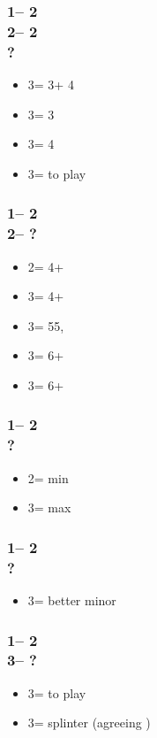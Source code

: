 \documentclass[12pt, a4paper]{article}
\begin{document}
\subsubsection*{1\nt -- 2\diams\\
                2\hearts -- 2\nt\\
                ?}
\begin{itemize}
    \item 3\clubs = 3\hearts + 4\clubs
    \item 3\diams = 3\hearts
    \item 3\hearts = 4\clubs
    \item 3\nt = to play
\end{itemize}

\subsubsection*{1\nt -- 2\hearts\\
                2\spades -- ?}
\begin{itemize}
    \item 2\nt = 4+\clubs\ \gf
    \item 3\clubs = 4+\diams \gf
    \item 3\diams = 55\major, \inv
    \item 3\hearts = 6+\spades \gf
    \item 3\spades = 6+\spades \inv
\end{itemize}

\subsubsection*{1\nt -- 2\spades\\
                ?}
\begin{itemize}
    \item 2\nt = min
    \item 3\clubs = max
\end{itemize}

\subsubsection*{1\nt -- 2\nt\\
                ?}
\begin{itemize}
    \item 3\minor = better minor
\end{itemize}

\subsubsection*{1\nt -- 2\nt\\
                3\minor -- ?}
\begin{itemize}
    \item 3\diams = to play
    \item 3\major = splinter (agreeing \diams)
\end{itemize}

\end{document}
